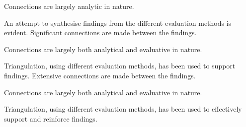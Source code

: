 \documentclass{../fal_assignment}
\begin{document}
\begin{markingrubric}
        \par     		Connections are largely analytic in nature.
        \par		An attempt to synthesise findings from the different evaluation methods is evident.
        \grade		Significant connections are made between the findings.
        \par		Connections are largely both analytical and evaluative in nature.
        \par		Triangulation, using different evaluation methods, has been used to support findings.
        \grade		Extensive connections are made between the findings.
        \par		Connections are largely both analytical and evaluative in nature.
        \par		Triangulation, using different evaluation methods, has been used to effectively support and reinforce findings.


\end{markingrubric}
\end{document}
